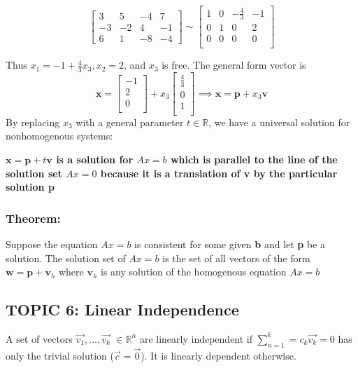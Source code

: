 \documentclass[12pt]{article} %
\newcommand{\R}{\mathbb{R}}
\begin{document}
$$\begin{bmatrix}
	3 & 5 & -4 & 7\\
	-3 & -2 & 4 & -1\\
	6 & 1 & -8 & -4
\end{bmatrix} \sim
\begin{bmatrix}
	1 & 0 & -\frac{4}{3} & -1\\
	0 & 1 & 0 & 2\\
	0 & 0 & 0 & 0\\
\end{bmatrix}$$

Thus $x_1 = -1 +\frac{4}{3}x_3,  x_2=2$, and $x_3$ is free. The general form vector is 
$$\mathbf{x} = \begin{bmatrix}
	-1\\
	2\\
	0\\
\end{bmatrix} + x_3\begin{bmatrix}
	\frac{4}{3}\\
	0\\
	1\\
\end{bmatrix} \implies \mathbf{x} = \mathbf{p} + x_3 \mathbf{v}$$
By replacing $x_3$ with a general parameter $t \in \R$, we have a universal solution for nonhomogenous systems:

\textbf{$\mathbf{x} = \mathbf{p} + t \mathbf{v}$ is a solution for $Ax = b$ which is parallel to the line of the solution set $Ax = 0$ because it is a translation of v by the particular solution p} 

\subsubsection{Theorem:}
Suppose the equation $Ax=b$ is consistent for some given \textbf{b} and let \textbf{p} be a solution. The solution set of $Ax =b$ is the set of all vectors of the form $\mathbf{w} = \mathbf{p} + \mathbf{v}_h$ where $\mathbf{v}_h$ is any solution of the homogenous equation $Ax=b$
\pagebreak
\subsection{TOPIC 6: Linear Independence}
A set of vectors {$\vec{v_1}, ..., \vec{v_k}$} $\in \R^n$ are linearly independent if $\sum_{n=1}^k = c_k \vec{v_k} = 0$ has only the trivial solution ($\vec{c} = \vec{0}$). It is linearly dependent otherwise. 
\end{document}
